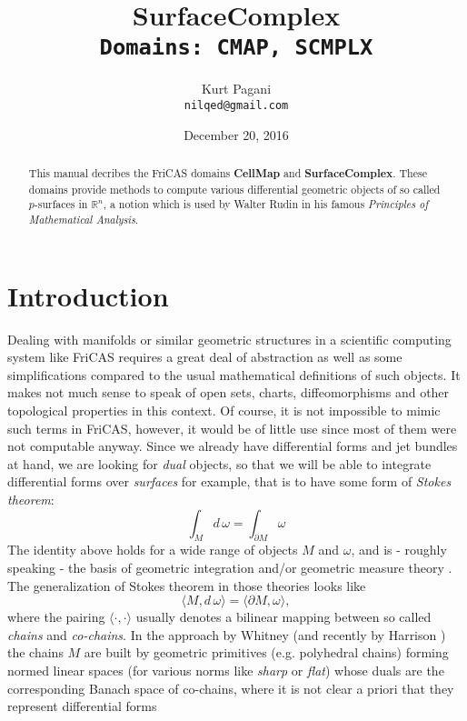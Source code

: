 \documentclass[12pt,a4paper]{article}
\author{Kurt Pagani \\ {\tt nilqed@gmail.com}}
\date{December 20, 2016}
\title{SurfaceComplex \\ {\small\tt Domains: CMAP, SCMPLX}}
\newcommand{\RR}[1]{\mathbb{R}^{#1}}
\begin{document}
\maketitle
%
\begin{abstract}
This manual decribes the FriCAS domains {\bf CellMap} and 
{\bf SurfaceComplex}. These domains provide methods to compute
various differential geometric objects of so called $p$-surfaces
in ${\RR n}$, a notion which is used by Walter Rudin in his famous
{\it Principles of Mathematical Analysis}. 
\end{abstract}
%
\tableofcontents
\section{Introduction}
%
Dealing with manifolds or similar geometric structures in a scientific
computing system like FriCAS requires a great deal of abstraction as well
as some simplifications compared to the usual mathematical definitions of
such objects. It makes not much sense to speak of open sets, charts,
diffeomorphisms and other topological properties in this context. Of 
course, it is not impossible to mimic such terms in FriCAS, however,
it would be of little use since most of them were not computable
anyway. Since we already have differential forms and jet bundles at
hand, we are looking for {\it dual} objects, so that we will be able
to integrate differential forms over {\it surfaces} for example, that
is to have some form of {\em Stokes theorem}:
\begin{displaymath}
  \int_{M} d\,\omega = \int_{\partial M} \omega
\end{displaymath}   
The identity above holds for a wide range of objects $M$ and $\omega$,
and is - roughly speaking - the basis of geometric integration 
\cite{GIT} and/or geometric measure theory \cite{GMT}. The generalization
of Stokes theorem in those theories looks like
\begin{displaymath}
    \langle M,d\, \omega\rangle = \langle \partial M, \omega \rangle,
\end{displaymath}  
where the pairing $\langle\cdot,\cdot\rangle$ usually denotes a bilinear
mapping between so called {\em chains} and {\em co-chains}. In the 
approach \cite{GIT} by Whitney (and recently by Harrison \cite{JH}) the
chains $M$ are built by geometric primitives (e.g. polyhedral chains)
forming normed linear spaces (for various norms like {\em sharp} or
{\em flat}) whose duals are the corresponding Banach space of co-chains,
where it is not clear a priori that they represent differential forms 
\end{document}
